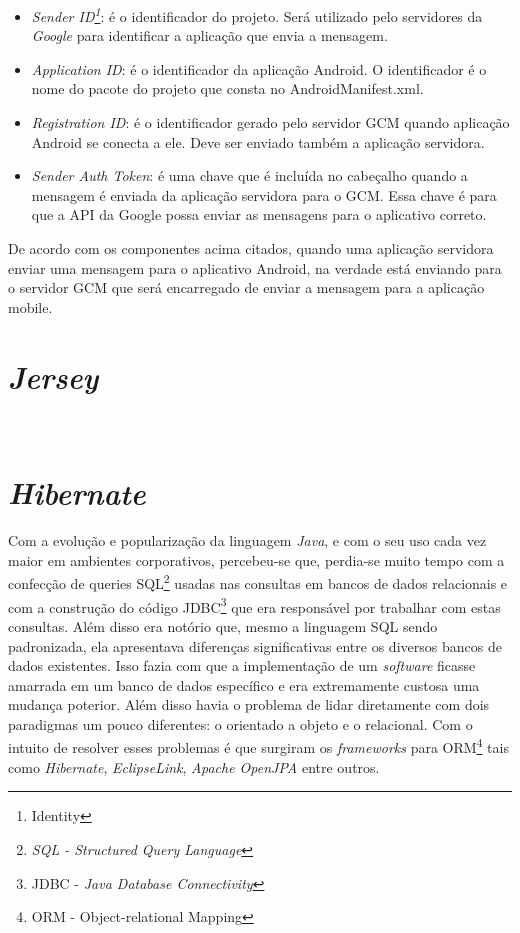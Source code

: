 \begin{itemize}
	
	\item \textit{Sender ID\footnote{Identity}}: é o identificador do projeto.
	Será utilizado pelo servidores da \textit{Google} para identificar a aplicação
	que envia a mensagem.
	
	\item \textit{Application ID}: é o identificador da aplicação Android. O
	identificador é o nome do pacote do projeto que consta no AndroidManifest.xml.
	
	\item \textit{Registration ID}: é o identificador gerado pelo servidor GCM
	quando aplicação Android se conecta a ele. Deve ser enviado também a aplicação
	servidora.
	
	\item \textit{Sender Auth Token}: é uma chave que é incluída no cabeçalho
	quando a mensagem é enviada da aplicação servidora para o GCM. Essa chave é
	para que a API da Google possa enviar as mensagens para o aplicativo correto.

\end{itemize}

	\par De acordo com os componentes acima citados, quando uma aplicação servidora
enviar uma mensagem para o aplicativo Android, na verdade está enviando para o
servidor GCM que será encarregado de enviar a mensagem para a aplicação mobile.

\section{\textit{Jersey}}

	\par\


\section{\textit{Hibernate}}

	\par Com a evolução e popularização da linguagem \textit{Java}, e com o seu
uso cada vez maior em ambientes corporativos, percebeu-se que, perdia-se muito
tempo com a confecção de queries SQL\footnote{\textit{SQL - Structured Query
Language}} usadas nas consultas em bancos de dados relacionais e com a
construção do código JDBC\footnote{JDBC - \textit{Java Database Connectivity}}
que era responsável por trabalhar com estas consultas. Além disso era notório
que, mesmo a linguagem SQL sendo padronizada, ela apresentava diferenças
significativas entre os diversos bancos de dados existentes. Isso fazia com que
a implementação de um \textit{software} ficasse amarrada em um banco de dados
específico e era extremamente custosa uma mudança poterior. Além disso havia o
problema de lidar diretamente com dois paradigmas um pouco diferentes: o
orientado a objeto e o relacional. Com o intuito de resolver esses problemas é
que surgiram os \textit{frameworks} para ORM\footnote{ORM - Object-relational
Mapping} tais como \textit{Hibernate}, \textit{EclipseLink}, \textit{Apache
OpenJPA} entre outros.


